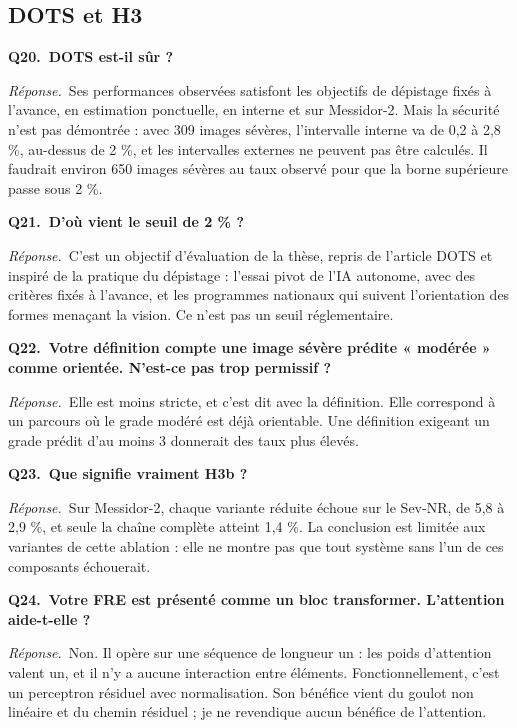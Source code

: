 \documentclass[11pt,a4paper]{article}
\begin{document}
\subsection*{DOTS et H3}
\textbf{Q20.~DOTS est-il sûr ?}\par\nopagebreak
\textit{Réponse.}~Ses performances observées satisfont les objectifs de dépistage fixés à l'avance, en estimation ponctuelle, en interne et sur Messidor-2. Mais la sécurité n'est pas démontrée : avec 309 images sévères, l'intervalle interne va de 0,2 à 2,8 \%, au-dessus de 2 \%, et les intervalles externes ne peuvent pas être calculés. Il faudrait environ 650 images sévères au taux observé pour que la borne supérieure passe sous 2 \%.\par\medskip
\textbf{Q21.~D'où vient le seuil de 2 \% ?}\par\nopagebreak
\textit{Réponse.}~C'est un objectif d'évaluation de la thèse, repris de l'article DOTS et inspiré de la pratique du dépistage : l'essai pivot de l'IA autonome, avec des critères fixés à l'avance, et les programmes nationaux qui suivent l'orientation des formes menaçant la vision. Ce n'est pas un seuil réglementaire.\par\medskip
\textbf{Q22.~Votre définition compte une image sévère prédite « modérée » comme orientée. N'est-ce pas trop permissif ?}\par\nopagebreak
\textit{Réponse.}~Elle est moins stricte, et c'est dit avec la définition. Elle correspond à un parcours où le grade modéré est déjà orientable. Une définition exigeant un grade prédit d'au moins 3 donnerait des taux plus élevés.\par\medskip
\textbf{Q23.~Que signifie vraiment H3b ?}\par\nopagebreak
\textit{Réponse.}~Sur Messidor-2, chaque variante réduite échoue sur le Sev-NR, de 5,8 à 2,9 \%, et seule la chaîne complète atteint 1,4 \%. La conclusion est limitée aux variantes de cette ablation : elle ne montre pas que tout système sans l'un de ces composants échouerait.\par\medskip
\textbf{Q24.~Votre FRE est présenté comme un bloc transformer. L'attention aide-t-elle ?}\par\nopagebreak
\textit{Réponse.}~Non. Il opère sur une séquence de longueur un : les poids d'attention valent un, et il n'y a aucune interaction entre éléments. Fonctionnellement, c'est un perceptron résiduel avec normalisation. Son bénéfice vient du goulot non linéaire et du chemin résiduel ; je ne revendique aucun bénéfice de l'attention.\par\medskip
\end{document}
